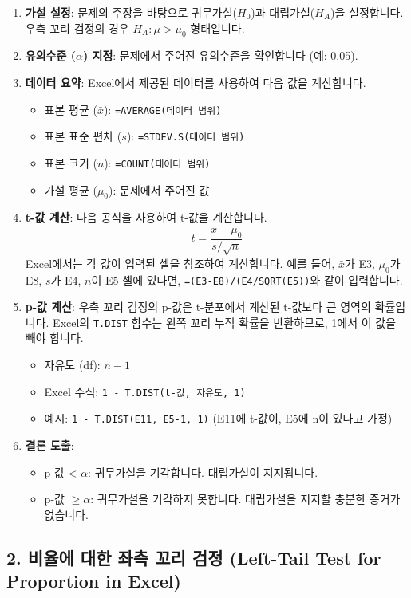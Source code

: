 \documentclass[11pt,a4paper]{article}
\theoremstyle{definition}
\begin{document}
\begin{enumerate}
    \item \textbf{가설 설정}: 문제의 주장을 바탕으로 귀무가설($H_0$)과 대립가설($H_A$)을 설정합니다. 우측 꼬리 검정의 경우 $H_A: \mu > \mu_0$ 형태입니다.
    \item \textbf{유의수준 ($\alpha$) 지정}: 문제에서 주어진 유의수준을 확인합니다 (예: 0.05).
    \item \textbf{데이터 요약}: Excel에서 제공된 데이터를 사용하여 다음 값을 계산합니다.
    \begin{itemize}
        \item 표본 평균 ($\bar{x}$): \texttt{=AVERAGE(데이터 범위)}
        \item 표본 표준 편차 ($s$): \texttt{=STDEV.S(데이터 범위)}
        \item 표본 크기 ($n$): \texttt{=COUNT(데이터 범위)}
        \item 가설 평균 ($\mu_0$): 문제에서 주어진 값
    \end{itemize}
    \item \textbf{t-값 계산}: 다음 공식을 사용하여 t-값을 계산합니다.
    $$t = \frac{\bar{x} - \mu_0}{s/\sqrt{n}}$$
    Excel에서는 각 값이 입력된 셀을 참조하여 계산합니다. 예를 들어, $\bar{x}$가 E3, $\mu_0$가 E8, $s$가 E4, $n$이 E5 셀에 있다면, \texttt{=(E3-E8)/(E4/SQRT(E5))}와 같이 입력합니다.
    \item \textbf{p-값 계산}: 우측 꼬리 검정의 p-값은 t-분포에서 계산된 t-값보다 큰 영역의 확률입니다. Excel의 \texttt{T.DIST} 함수는 왼쪽 꼬리 누적 확률을 반환하므로, 1에서 이 값을 빼야 합니다.
    \begin{itemize}
        \item 자유도 (df): $n-1$
        \item Excel 수식: \texttt{1 - T.DIST(t-값, 자유도, 1)}
        \item 예시: \texttt{1 - T.DIST(E11, E5-1, 1)} (E11에 t-값이, E5에 n이 있다고 가정)
    \end{itemize}
    \item \textbf{결론 도출}:
    \begin{itemize}
        \item p-값 < $\alpha$: 귀무가설을 기각합니다. 대립가설이 지지됩니다.
        \item p-값 $\ge \alpha$: 귀무가설을 기각하지 못합니다. 대립가설을 지지할 충분한 증거가 없습니다.
    \end{itemize}
\end{enumerate}

\subsection*{2. 비율에 대한 좌측 꼬리 검정 (Left-Tail Test for Proportion in Excel)}
\end{document}

